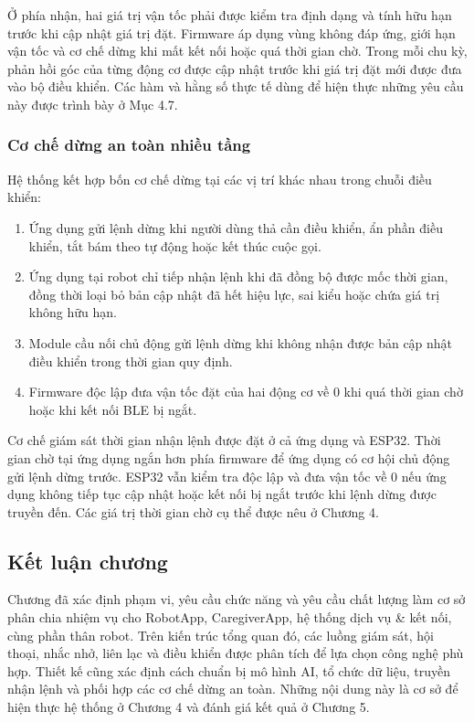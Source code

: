 Ở phía nhận, hai giá trị vận tốc phải được kiểm tra định dạng và tính hữu hạn trước khi cập nhật giá trị đặt. Firmware áp dụng vùng không đáp ứng, giới hạn vận tốc và cơ chế dừng khi mất kết nối hoặc quá thời gian chờ. Trong mỗi chu kỳ, phản hồi góc của từng động cơ được cập nhật trước khi giá trị đặt mới được đưa vào bộ điều khiển. Các hàm và hằng số thực tế dùng để hiện thực những yêu cầu này được trình bày ở Mục 4.7.

\subsubsection{Cơ chế dừng an toàn nhiều tầng}

Hệ thống kết hợp bốn cơ chế dừng tại các vị trí khác nhau trong chuỗi điều khiển:

\begin{enumerate}
    \item Ứng dụng gửi lệnh dừng khi người dùng thả cần điều khiển, ẩn phần điều khiển, tắt bám theo tự động hoặc kết thúc cuộc gọi.
    \item Ứng dụng tại robot chỉ tiếp nhận lệnh khi đã đồng bộ được mốc thời gian, đồng thời loại bỏ bản cập nhật đã hết hiệu lực, sai kiểu hoặc chứa giá trị không hữu hạn.
    \item Module cầu nối chủ động gửi lệnh dừng khi không nhận được bản cập nhật điều khiển trong thời gian quy định.
    \item Firmware độc lập đưa vận tốc đặt của hai động cơ về 0 khi quá thời gian chờ hoặc khi kết nối BLE bị ngắt.
\end{enumerate}

Cơ chế giám sát thời gian nhận lệnh được đặt ở cả ứng dụng và ESP32. Thời gian chờ tại ứng dụng ngắn hơn phía firmware để ứng dụng có cơ hội chủ động gửi lệnh dừng trước. ESP32 vẫn kiểm tra độc lập và đưa vận tốc về 0 nếu ứng dụng không tiếp tục cập nhật hoặc kết nối bị ngắt trước khi lệnh dừng được truyền đến. Các giá trị thời gian chờ cụ thể được nêu ở Chương 4.

\subsection{Kết luận chương}

Chương đã xác định phạm vi, yêu cầu chức năng và yêu cầu chất lượng làm cơ sở phân chia nhiệm vụ cho RobotApp, CaregiverApp, hệ thống dịch vụ \& kết nối, cùng phần thân robot. Trên kiến trúc tổng quan đó, các luồng giám sát, hội thoại, nhắc nhở, liên lạc và điều khiển được phân tích để lựa chọn công nghệ phù hợp. Thiết kế cũng xác định cách chuẩn bị mô hình AI, tổ chức dữ liệu, truyền nhận lệnh và phối hợp các cơ chế dừng an toàn. Những nội dung này là cơ sở để hiện thực hệ thống ở Chương 4 và đánh giá kết quả ở Chương 5.
